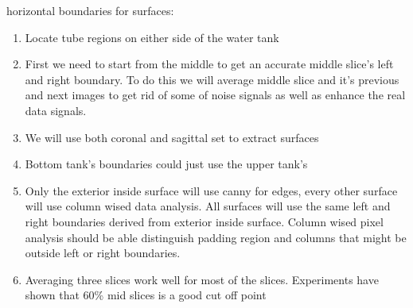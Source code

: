horizontal boundaries for surfaces:
\begin{enumerate}
\item Locate tube regions on either side of the water tank
\item First we need to start from the middle to get an accurate middle slice's left and right boundary. To
  do this we will average middle slice and it's previous and next images to get rid of some of noise signals 
  as well as enhance the real data signals. 
\item We will use both coronal and sagittal set to extract surfaces
\item Bottom tank's boundaries could just use the upper tank's
\item Only the exterior inside surface will use canny for edges, every other surface will use column wised
  data analysis. 
  All surfaces will use the same left and right boundaries derived from exterior inside surface.
  Column wised pixel analysis should be able distinguish padding region and columns that might be outside
  left or right boundaries.
\item Averaging three slices work well for most of the slices. Experiments have shown that 60\% mid slices 
  is a good cut off point
\end{enumerate}